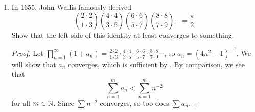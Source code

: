 \begin{problem}
\begin{enumerate}[label=(\alph*)]
    \item In 1655, John Wallis famously derived
      \[
        \left( \frac{2 \cdot 2}{1 \cdot 3} \right) \left( \frac{4 \cdot 4}{3 \cdot 5} \right) \left( \frac{6 \cdot 6}{5 \cdot 7} \right) \left( \frac{8 \cdot 8}{7 \cdot 9} \right) \cdots = \frac{\pi}{2}
      \]
      Show that the left side of this identity at least converges to something.

      \begin{proof}
        Let $\prod_{n=1}^{\infty} (1 + a_{n}) = \frac{2 \cdot 2}{1 \cdot 3} \cdot \frac{4 \cdot 4}{3 \cdot 5} \cdot \frac{6 \cdot 6}{5 \cdot 7} \cdot \frac{8 \cdot 8}{7 \cdot 9} \cdots$, so $a_{n} = (4n^{2} -1)^{-1}$.
        We will show that $a_{n}$ converges, which is sufficient by .
        By comparison, we see that
        \[
          \sum_{n=1}^{m} a_{n} < \sum_{n=1}^{m} n^{-2}
        \]
        for all $m \in \mathbb{N}$.
        Since $\sum n^{-2}$ converges, so too does $\sum a_{n}$.
      \end{proof}

  \end{enumerate}

\end{problem}

